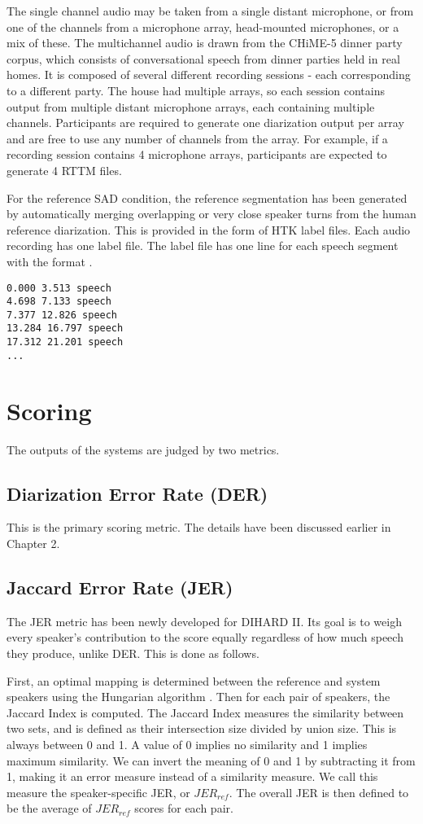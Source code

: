 The single channel audio may be taken from a single distant microphone, or from one of the channels from a microphone array, head-mounted microphones, or a mix of these. The multichannel audio is drawn from the CHiME-5 dinner party corpus, which consists of conversational speech from dinner parties held in real homes. It is composed of several different recording sessions - each corresponding to a different party. The house had multiple arrays, so each session contains output from multiple distant microphone arrays, each containing multiple channels. Participants are required to generate one diarization output per array and are free to use any number of channels from the array. For example, if a recording session contains 4 microphone arrays, participants are expected to generate 4 RTTM files.

For the reference SAD condition, the reference segmentation has been generated by automatically merging overlapping or very close speaker turns from the human reference diarization. This is provided in the form of HTK label files. Each audio recording has one label file. The label file has one line for each speech segment with the format .

\begin{verbatim}
0.000 3.513 speech
4.698 7.133 speech
7.377 12.826 speech
13.284 16.797 speech
17.312 21.201 speech
...
\end{verbatim}

\section{Scoring}
The outputs of the systems are judged by two metrics.

	\subsection{Diarization Error Rate (DER)}
	This is the primary scoring metric. The details have been discussed earlier in Chapter 2.
	
	\subsection{Jaccard Error Rate (JER)}
	The JER metric has been newly developed for DIHARD II. Its goal is to weigh every speaker's contribution to the score equally regardless of how much speech they produce, unlike DER. This is done as follows.
	
	First, an optimal mapping is determined between the reference and system speakers using the Hungarian algorithm \cite{hungarian}. Then for each pair of speakers, the Jaccard Index \cite{hamers1989similarity} is computed. The Jaccard Index measures the similarity between two sets, and is defined as their intersection size divided by union size. This is always between 0 and 1. A value of 0 implies no similarity and 1 implies maximum similarity. We can invert the meaning of 0 and 1 by subtracting it from 1, making it an error measure instead of a similarity measure. We call this measure the speaker-specific JER, or $JER_{ref}$. The overall JER is then defined to be the average of $JER_{ref}$ scores for each pair.
	
